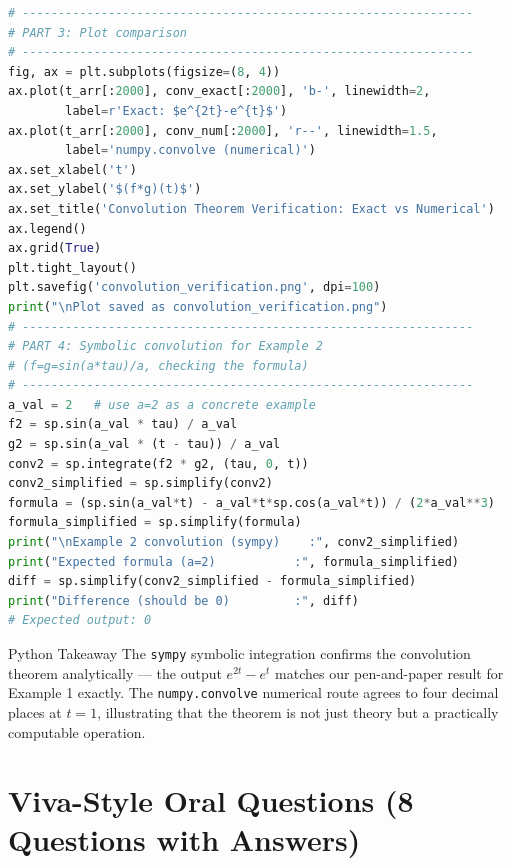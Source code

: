 \documentclass[12pt,a4paper]{article}
\begin{document}
\begin{lstlisting}[language=Python, caption={Convolution Theorem --- Symbolic and Numerical Verification}]
# ---------------------------------------------------------------
# PART 3: Plot comparison
# ---------------------------------------------------------------
fig, ax = plt.subplots(figsize=(8, 4))
ax.plot(t_arr[:2000], conv_exact[:2000], 'b-', linewidth=2,
        label=r'Exact: $e^{2t}-e^{t}$')
ax.plot(t_arr[:2000], conv_num[:2000], 'r--', linewidth=1.5,
        label='numpy.convolve (numerical)')
ax.set_xlabel('t')
ax.set_ylabel('$(f*g)(t)$')
ax.set_title('Convolution Theorem Verification: Exact vs Numerical')
ax.legend()
ax.grid(True)
plt.tight_layout()
plt.savefig('convolution_verification.png', dpi=100)
print("\nPlot saved as convolution_verification.png")
# ---------------------------------------------------------------
# PART 4: Symbolic convolution for Example 2
# (f=g=sin(a*tau)/a, checking the formula)
# ---------------------------------------------------------------
a_val = 2   # use a=2 as a concrete example
f2 = sp.sin(a_val * tau) / a_val
g2 = sp.sin(a_val * (t - tau)) / a_val
conv2 = sp.integrate(f2 * g2, (tau, 0, t))
conv2_simplified = sp.simplify(conv2)
formula = (sp.sin(a_val*t) - a_val*t*sp.cos(a_val*t)) / (2*a_val**3)
formula_simplified = sp.simplify(formula)
print("\nExample 2 convolution (sympy)    :", conv2_simplified)
print("Expected formula (a=2)           :", formula_simplified)
diff = sp.simplify(conv2_simplified - formula_simplified)
print("Difference (should be 0)         :", diff)
# Expected output: 0
\end{lstlisting}

\begin{learnbox}{Python Takeaway}
The \texttt{sympy} symbolic integration confirms the convolution theorem analytically ---
the output $e^{2t}-e^{t}$ matches our pen-and-paper result for Example 1 exactly.
The \texttt{numpy.convolve} numerical route agrees to four decimal places at $t=1$,
illustrating that the theorem is not just theory but a practically computable operation.
\end{learnbox}

\section{Viva-Style Oral Questions (8 Questions with Answers)}
\end{document}
